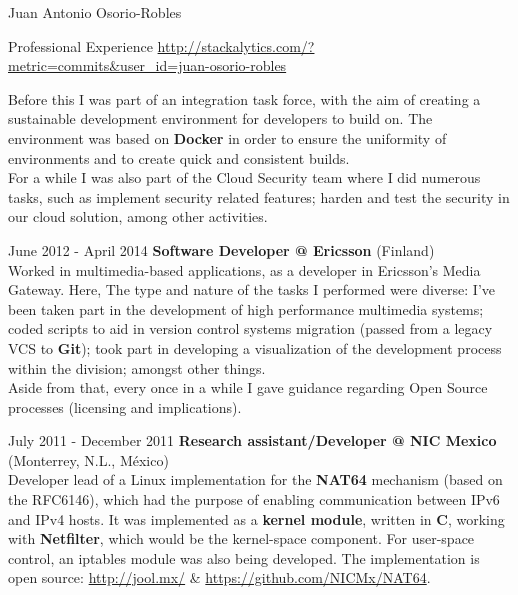 \documentclass[spanish,10pt,letterpaper]{article}
\begin{document}
\begin{cv}{Juan Antonio Osorio-Robles}
\begin{cvlist}{Professional Experience}
            \href{http://stackalytics.com/?metric=commits&user_id=juan-osorio-robles}
            {\url{http://stackalytics.com/?metric=commits&user_id=juan-osorio-robles}}

            Before this I was part of an integration task force, with the
            aim of creating a sustainable development environment for
            developers to build on. The environment was based on
            \textbf{Docker} in order to ensure the uniformity of
            environments and to create quick and consistent builds.\\

            For a while I was also part of the Cloud Security team where
            I did numerous tasks, such as implement security related
            features; harden and test the security in our cloud solution,
            among other activities.

		\item [June 2012 - April 2014]
            \textbf{Software Developer @ Ericsson} (Finland)\\
            Worked in multimedia-based applications, as a developer in
            Ericsson's Media Gateway. Here, The type and nature of the
            tasks I performed were diverse: I've been taken part in the
            development of high performance multimedia systems; coded
            scripts to aid in version control systems migration (passed
            from a legacy VCS to \textbf{Git}); took part in developing a
            visualization of the development process within the division;
            amongst other things.\\

            Aside from that, every once in a while I gave guidance
            regarding Open Source processes (licensing and implications).

		\item [July 2011 - December 2011]
            \textbf{Research assistant/Developer @ NIC Mexico} (Monterrey,
            N.L., M\'{e}xico)\\
            Developer lead of a Linux implementation for the \textbf{NAT64}
            mechanism (based on the RFC6146), which had the purpose of
            enabling communication between IPv6 and IPv4 hosts. It was
            implemented as a \textbf{kernel module}, written in \textbf{C},
            working with \textbf{Netfilter}, which would be the kernel-space
            component. For user-space control, an iptables module was also
            being developed. The implementation is open source:
            \href{http://jool.mx/}{http://jool.mx/} \&
            \href{https://github.com/NICMx/NAT64}{https://github.com/NICMx/NAT64}.


\end{cvlist}
\end{cv}
\end{document}
